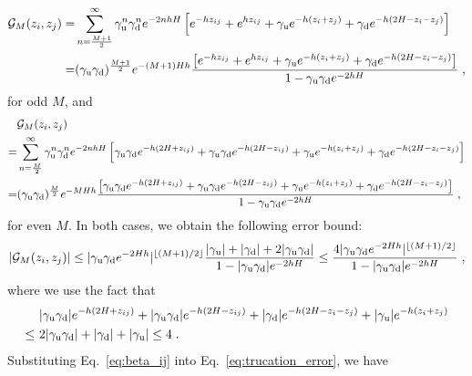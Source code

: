 \begin{equation}
    \begin{split}
        \mathcal{G}_{M}(z_i,z_j) = & \sum_{n = \frac{M + 1}{2}}^{\infty} \gamma_{\text{u}}^n \gamma_{\text{d}}^n e^{-2nhH} \left[ e^{- h z_{ij}} + e^{h z_{ij}} + \gamma_{\text{u}} e^{- h (z_i + z_j)} + \gamma_{\text{d}} e^{- h (2 H  - z_i - z_j)}\right] \\
        = & (\gamma_{\text{u}} \gamma_{\text{d}})^{\frac{M + 1}{2}} e^{- (M +1) H h} \frac{\left[e^{-h z_{ij}} + e^{h z_{ij}} + \gamma_{\text{u}} e^{- h (z_i + z_j)} + \gamma_{\text{d}} e^{- h (2 H - z_i - z_j)} \right] }{1 - \gamma_{\text{u}} \gamma_{\text{d}} e^{-2hH}} \;,
    \end{split}
\end{equation}
for odd $M$, and 
\begin{equation}
    \begin{split}
        & \mathcal{G}_M(z_i,z_j) \\
        = & \sum_{n = \frac{M}{2}}^{\infty}  \gamma_{\text{u}}^n \gamma_{\text{d}}^n e^{- 2nhH} \left[  \gamma_{\text{u}} \gamma_{\text{d}} e^{- h (2 H  + z_{ij})} + \gamma_{\text{u}} \gamma_{\text{d}}  e^{- h (2 H  - z_{ij})} + \gamma_{\text{u}} e^{- h (z_i + z_j)} + \gamma_{\text{d}} e^{- h (2H  - z_i - z_j)} \right] \\
        = & (\gamma_{\text{u}} \gamma_{\text{d}})^{\frac{M}{2}} e^{- M H h} \frac{\left[ \gamma_{\text{u}} \gamma_{\text{d}} e^{- h (2 H + z_{ij})} + \gamma_{\text{u}} \gamma_{\text{d}} e^{- h (2H - z_{ij})} + \gamma_{\text{u}} e^{ - h (z_i + z_j)} + \gamma_{\text{d}} e^{-h (2 H - z_i - z_j)} \right]}{1 - \gamma_{\text{u}} \gamma_{\text{d}} e^{-2hH}}  \;,
    \end{split}
\end{equation}
for even $M$. In both cases, we obtain the following error bound:
\begin{equation}\label{eq:beta_ij}
    \lvert \mathcal{G}_{M}(z_i,z_j) \rvert \leq \lvert\gamma_{\text{u}} \gamma_{\text{d}} e^{- 2 H h}\rvert^{\lfloor{(M+1)/2}\rfloor} \frac{\lvert\gamma_{\text{u}}\rvert + \lvert\gamma_{\text{d}}\rvert + 2 \lvert\gamma_{\text{u}} \gamma_{\text{d}}\rvert}{1 - \lvert\gamma_{\text{u}} \gamma_{\text{d}}\rvert e^{-2hH}} \leq \frac{4 \lvert\gamma_{\text{u}} \gamma_{\text{d}} e^{- 2 H h}\rvert^{\lfloor{(M+1)/2}\rfloor}}{1 - \lvert\gamma_{\text{u}} \gamma_{\text{d}}\rvert e^{-2hH}} \;,
\end{equation}
where we use the fact that 
\begin{equation}
    \begin{split}
        & ~ \lvert\gamma_{\text{u}} \gamma_{\text{d}}\rvert e^{-h(2 H + z_{ij})} + \lvert\gamma_{\text{u}} \gamma_{\text{d}}\rvert e^{ - h (2 H - z_{ij})} + \lvert\gamma_{\text{d}}\rvert e^{- h (2 H - z_i - z_j)} + \lvert\gamma_{\text{u}}\rvert e^{- h (z_i + z_j)} \\
        \leq & ~ 2 \lvert\gamma_{\text{u}} \gamma_{\text{d}}\rvert +\lvert\gamma_{\text{d}}\rvert + \lvert\gamma_{\text{u}}\rvert \leq 4 \;.
    \end{split}
\end{equation}
Substituting Eq.~\eqref{eq:beta_ij} into Eq.~\eqref{eq:trucation_error}, we have

